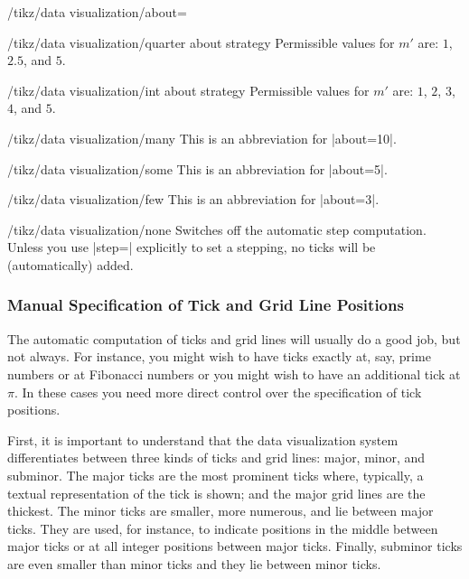 \begin{key}{/tikz/data visualization/about=}
    \begin{key}{/tikz/data visualization/quarter about strategy}
        Permissible values for $m'$ are: $1$, $2.5$, and $5$.

    \end{key}

    \begin{key}{/tikz/data visualization/int about strategy}
        Permissible values for $m'$ are: $1$, $2$, $3$, $4$, and $5$.

    \end{key}
\end{key}

\begin{key}{/tikz/data visualization/many}
    This is an abbreviation for |about=10|.
\end{key}

\begin{key}{/tikz/data visualization/some}
    This is an abbreviation for |about=5|.
\end{key}

\begin{key}{/tikz/data visualization/few}
    This is an abbreviation for |about=3|.
\end{key}

\begin{key}{/tikz/data visualization/none}
    Switches off the automatic step computation. Unless you use |step=| explicitly to set a stepping, no ticks will be (automatically) added.
\end{key}


\subsubsection{Manual Specification of Tick and Grid Line Positions}

The automatic computation of ticks and grid lines will usually do a good job, but not always. For instance, you might wish to have ticks exactly at, say, prime numbers or at Fibonacci numbers or you might wish to have an additional tick at $\pi$. In these cases you need more direct control over the specification of tick positions.

First, it is important to understand that the data visualization system differentiates between three kinds of ticks and grid lines: major, minor, and subminor. The major ticks are the most prominent ticks where, typically, a textual representation of the tick is shown; and the major grid lines are the thickest. The minor ticks are smaller, more numerous, and lie between major ticks. They are used, for instance, to indicate positions in the middle between major ticks or at all integer positions between major ticks. Finally, subminor ticks are even smaller than minor ticks and they lie between minor ticks.

